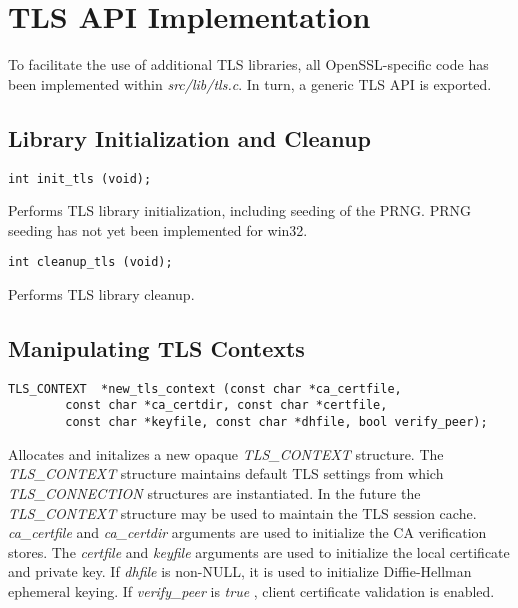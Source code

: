 \section{TLS API Implementation}

To facilitate the use of additional TLS libraries, all OpenSSL-specific
code has been implemented within \emph{src/lib/tls.c}.  In turn, a generic
TLS API is exported.

\subsection{Library Initialization and Cleanup}

\footnotesize
\begin{verbatim}
int init_tls (void);
\end{verbatim}
\normalsize

Performs TLS library initialization, including seeding of the PRNG. PRNG
seeding has not yet been implemented for win32.

\footnotesize
\begin{verbatim}
int cleanup_tls (void);
\end{verbatim}
\normalsize

Performs TLS library cleanup.

\subsection{Manipulating TLS Contexts}

\footnotesize
\begin{verbatim}
TLS_CONTEXT  *new_tls_context (const char *ca_certfile,
        const char *ca_certdir, const char *certfile,
        const char *keyfile, const char *dhfile, bool verify_peer);
\end{verbatim}
\normalsize

Allocates and initalizes a new opaque \emph{TLS\_CONTEXT} structure.  The
\emph{TLS\_CONTEXT} structure maintains default TLS settings from which
\emph{TLS\_CONNECTION} structures are instantiated.  In the future the
\emph{TLS\_CONTEXT} structure may be used to maintain the TLS session
cache.  \emph{ca\_certfile} and \emph{ca\_certdir} arguments are used to
initialize the CA verification stores.  The \emph{certfile} and
\emph{keyfile} arguments are used to initialize the local certificate and
private key.  If \emph{dhfile} is non-NULL, it is used to initialize
Diffie-Hellman ephemeral keying.  If \emph{verify\_peer} is \emph{true} ,
client certificate validation is enabled.


